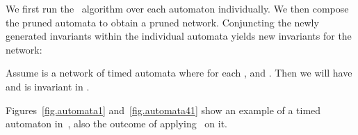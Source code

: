 \documentclass{eptcs}
\begin{document}
We first run the \cipm\ algorithm over each automaton individually. We then compose the
pruned automata to obtain a pruned network. Conjuncting the newly generated
invariants within the individual automata yields new invariants for the network:
\begin{theorem}
\label{theo.parallel}
Assume  is a network of timed automata where
 for each , and . Then we will have  and  is invariant in .
\end{theorem}








\begin{example}
\label{example1} Figures~\ref{fig.automata1} and~\ref{fig.automata41} show an example of a
timed automaton  in~\cite{Moller02,Sorea:FTRTFT04}, also the outcome of applying \cipm\ on it.



\end{example}
\end{document}
